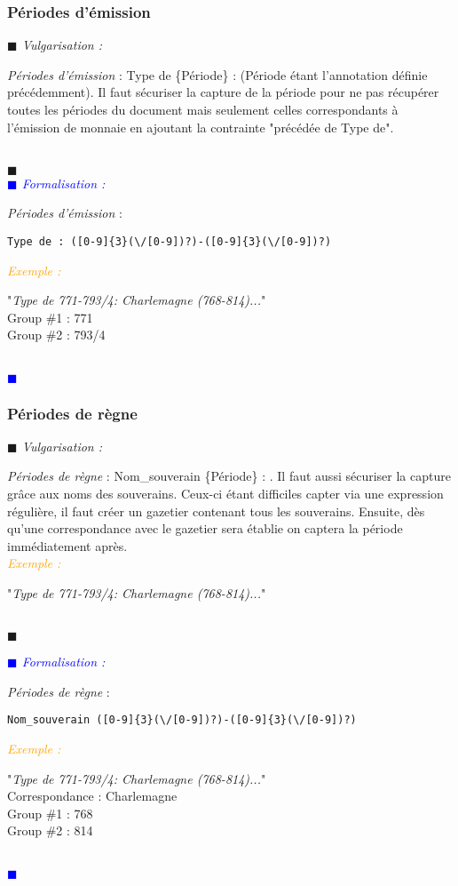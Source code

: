 \documentclass[a4paper, 11pt]{book}
\newenvironment{vulgarisation}
    {
    \textit{\textcolor{dark-blue}{$\blacksquare$  Vulgarisation : \\}}

    }
    {
    ~\\\textcolor{dark-blue}{$\blacksquare$}\\
    }
\newenvironment{formalisation}
    {
    \textit{\textcolor{blue}{$\blacksquare$  Formalisation : \\}}
    }
    {
    ~\\\textcolor{blue}{$\blacksquare$}\\
    }
\newenvironment{exemple}
    {
    \textit{\textcolor{orange}{
    Exemple : \\}}
    }
    {\\
    }
\begin{document}
\subsubsection{Périodes d'émission}
\begin{vulgarisation}
	\textit{Périodes d'émission} : \og Type de \{Période\} : \fg{} (Période étant l'annotation définie précédemment).
	Il faut sécuriser la capture de la période pour ne pas récupérer toutes les périodes du document mais seulement celles correspondants à l’émission de monnaie en ajoutant la contrainte "précédée de Type de".
\end{vulgarisation}
\begin{formalisation}
	\textit{Périodes d'émission} : 
	\begin{verbatim}
Type de : ([0-9]{3}(\/[0-9])?)-([0-9]{3}(\/[0-9])?)
	\end{verbatim}
	\begin{exemple}
		"\emph{Type de 771-793/4: Charlemagne (768-814)...}" \\
		Group \#1 : 771 \\
		Group \#2 : 793/4
	\end{exemple}
\end{formalisation}

\subsubsection{Périodes de règne}
\begin{vulgarisation}
	\textit{Périodes de règne} : \og Nom\_souverain \{Période\} : \fg{}. Il faut aussi sécuriser la capture grâce aux noms des souverains. Ceux-ci étant difficiles capter via une expression régulière, il faut créer un gazetier contenant tous les souverains. Ensuite, dès qu'une correspondance avec le gazetier sera établie on captera la période immédiatement après.\\
	\begin{exemple}
		"\emph{Type de 771-793/4: Charlemagne (768-814)...}" 
	\end{exemple}
\end{vulgarisation}

\begin{formalisation}
	\textit{Périodes de règne} : 
	\begin{verbatim}
Nom_souverain ([0-9]{3}(\/[0-9])?)-([0-9]{3}(\/[0-9])?)
	\end{verbatim}
	\begin{exemple}
		"\emph{Type de 771-793/4: Charlemagne (768-814)...}" \\
		Correspondance : Charlemagne \\
		Group \#1 : 768 \\
		Group \#2 : 814
	\end{exemple}
\end{formalisation}
\end{document}
